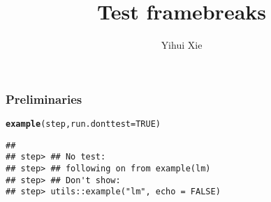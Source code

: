 \documentclass{beamer}\usepackage[]{graphicx}\usepackage[]{color}
\title{Test framebreaks}
\author{Yihui Xie}
\newcommand{\hlnum}[1]{\textcolor[rgb]{0.686,0.059,0.569}{#1}}%
\newcommand{\hlstd}[1]{\textcolor[rgb]{0.345,0.345,0.345}{#1}}%
\newcommand{\hlkwc}[1]{\textcolor[rgb]{0.333,0.667,0.333}{#1}}%
\newcommand{\hlkwd}[1]{\textcolor[rgb]{0.737,0.353,0.396}{\textbf{#1}}}%
\newenvironment{knitrout}{}{} %
\begin{document}
\maketitle


\begin{frame}
\frametitle{Preliminaries}
\begin{knitrout}\footnotesize
{}\color{fgcolor}
\begin{alltt}
\hlkwd{example}\hlstd{(step,} \hlkwc{run.donttest} \hlstd{=} \hlnum{TRUE}\hlstd{)}
\end{alltt}
\begin{verbatim}
## 
## step> ## No test: 
## step> ## following on from example(lm)
## step> ## Don't show: 
## step> utils::example("lm", echo = FALSE)
\end{verbatim}


\end{knitrout}
\end{frame}
\end{document}
